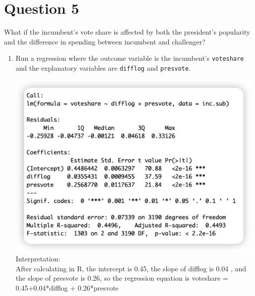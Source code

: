 \documentclass[12pt,letterpaper]{article}
\begin{document}
\section*{Question 5}
\noindent What if the incumbent's vote share is affected by both the president's popularity and the difference in spending between incumbent and challenger? 
	\begin{enumerate}
		\item Run a regression where the outcome variable is the incumbent's \texttt{voteshare} and the explanatory variables are \texttt{difflog} and \texttt{presvote}.	\vspace{1cm}
		
		\vspace{1cm}
		\includegraphics[width=0.99\textwidth]{5-1.png}	
		\vspace{1cm}
		\noindent
		Interpretation:\\
		After calculating in R, the intercept is 0.45, the slope of difflog is 0.04 , and the slope of presvote is 0.26, so the regression equation is voteshare = 0.45+0.04*difflog + 0.26*presvote \\
		

\end{enumerate}
\end{document}
